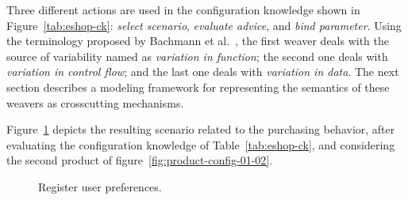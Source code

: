 \documentclass{acm_proc_article-sp}
\begin{document}
Three different actions are used in the configuration knowledge shown in
Figure~\ref{tab:eshop-ck}: \emph{select scenario},
\emph{evaluate advice}, and \emph{bind parameter}. Using the terminology
proposed by Bachmann et al.~\cite{Bachmann:2001aa}, the first weaver deals with
the source of variability named as \emph{variation in function}; the second one
deals with \emph{variation in control flow}; and the last one deals with
\emph{variation in data}. The next section describes a modeling framework 
for representing the semantics of these weavers as crosscutting mechanisms.

Figure~\ref{fig:resulting-purchase} depicts the resulting scenario related to
the purchasing behavior, after evaluating the configuration knowledge of
Table~\ref{tab:eshop-ck}, and considering the second product of
figure~\ref{fig:product-config-01-02}.


\begin{figure}[h]
\caption{Register user preferences.}
\label{fig:resulting-purchase}
\end{figure}		
\end{document}
